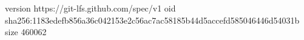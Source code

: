 version https://git-lfs.github.com/spec/v1
oid sha256:1183edefb856a36c042153e2c56ac7ac58185b44d5accefd585046446d54031b
size 460062
